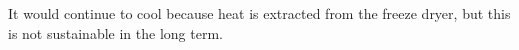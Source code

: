 It would continue to cool because heat is extracted from the freeze dryer, but this is not sustainable in the long term.